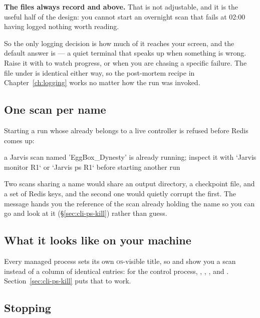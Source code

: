 \textbf{The files always record  and above.} That is not adjustable, and it is
the useful half of the design: you cannot start an overnight scan that fails at 02:00
having logged nothing worth reading.

So the only logging decision is how much of it reaches your screen, and the default answer
is  --- a quiet terminal that speaks up when something is wrong. Raise it
with  to watch progress, or  when you are chasing a
specific failure. The file under  is identical either way, so the
post-mortem recipe in Chapter~\ref{ch:logging} works no matter how the run was invoked.

\subsection{One scan per name}

Starting a run whose  already belongs to a live controller is refused
before Redis comes up:

\begin{terminal}
\begin{jout}
a Jarvis scan named 'EggBox_Dynesty' is already running; inspect it with
`Jarvis monitor R1` or `Jarvis ps R1` before starting another run
\end{jout}
\end{terminal}

Two scans sharing a name would share an output directory, a checkpoint file, and a set of
Redis keys, and the second one would quietly corrupt the first. The message hands you the
reference of the scan already holding the name so you can go and look at it
(\S\ref{sec:cli-ps-kill}) rather than guess.

\subsection{What it looks like on your machine}

Every managed process sets its own \textsc{os}-visible title, so  and 
show you a scan instead of a column of identical  entries:
 for the control process,
,
, ,
and . Section~\ref{sec:cli-ps-kill} puts that to
work.

\subsection{Stopping}

